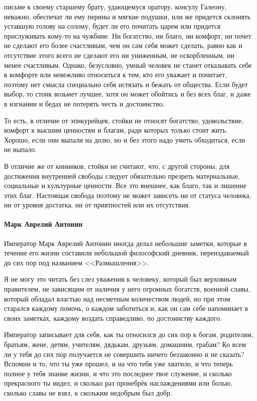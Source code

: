 письме к своему старшему брату, удающемуся оратору, консулу Галеону, неважно,
обеспечат ли ему перины и мягкие подушки, или же придется склонять уставшую
голову на солому, будет ли его почитать царем или придется прислуживать кому-то
на чужбине. Ни богатство, ни благо, ни комфорт, ни почет не сделают его более
счастливым, чем он сам себя может сделать, равно как и отсутствие этого всего не
сделают его ни униженным, не оскорбленным, ни менее счастливым. Однако,
безусловно, умный человек не станет отказывать себе в комфорте или невежливо
относиться к тем, кто его уважает и почитает, поэтому нет смысла специально себя
истязать и бежать от общества. Если будет выбор, то стоик возьмет лучшее, хотя
он может обойтись и без всех благ, и даже в изгнании и бедах не потерять честь и
достоинство. 

То есть, в отличие от эпикурейцев, стойки не относят богатство,
удовольствие, комфорт к высшим ценностям и благам, ради которых только стоит
жить. Хорошо, если они выпали на долю, но и без этого надо уметь обходиться,
если не выпало. 

В отличие же от кинников, стойки не считают, что, с другой
стороны, для достижения внутренней свободы следует обязательно презреть
материальные, социальные и культурные ценности. Все это внешнее, как благо, так
и лишение этих благ. 
Настоящая свобода поэтому не может зависеть ни от статуса человека, ни от уровня достатка, ни от приятностей или их отсутствия. 

\paragraph{Марк Аврелий Антонин}

Император Марк Аврелий Антонин иногда делал небольшие заметки, которые в течение его жизни составили небольшой философский дневник, переиздаваемый до сих пор под названием <<Размышления>>. 

Я не могу это читать без слез уважения к человеку, который был
верховным правителем, не зависящим от наличия у него огромных богатств, военной славы, который обладал властью над несметным количеством людей, но при этом
старался каждому помочь, о каждом заботиться и, как он сам себе напоминает в
своих заметках, каждому воздать справедливо, по достоинству каждого. 

Император записывает для себя, как ты относился до сих пор к богам, родителям, братьям, жене, детям, учителям, дядькам, друзьям, домашним, грабам? Ко всем ли у тебя до сих пор получается не совершить ничего беззаконно и не сказать? Вспомни и то, что ты уже прошел, и на что тебя уже хватило, и что теперь полное у тебя знание жизни, и что это последнее твое служение, и сколько прекрасного ты видел, и сколько раз пронебрёк наслаждениями или болью, сколько славы не взял, к скольким
недобрым был добр. 

